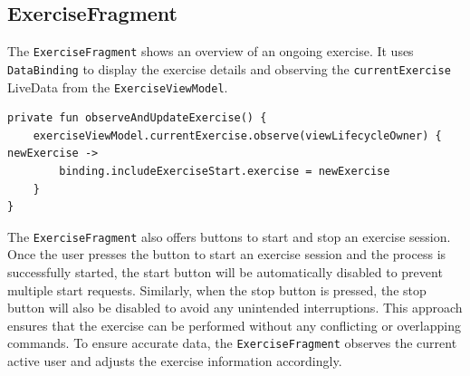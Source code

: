 \subsection{ExerciseFragment}
The \texttt{ExerciseFragment} shows an overview of an ongoing exercise. It uses \texttt{DataBinding} to display the exercise details and observing the \texttt{currentExercise} LiveData from the \texttt{ExerciseViewModel}. 
\begin{lstlisting}[caption={Observer for currentExercise (HomeFragment)}]
private fun observeAndUpdateExercise() {
    exerciseViewModel.currentExercise.observe(viewLifecycleOwner) { newExercise ->
        binding.includeExerciseStart.exercise = newExercise
    }
}
\end{lstlisting}

The \texttt{ExerciseFragment} also offers buttons to start and stop an exercise session.
Once the user presses the button to start an exercise session and the process is successfully started, the start button will be automatically disabled to prevent multiple start requests. Similarly, when the stop button is pressed, the stop button will also be disabled to avoid any unintended interruptions. 
This approach ensures that the exercise can be performed without any conflicting or overlapping commands.
To ensure accurate data, the \texttt{ExerciseFragment} observes the current active user and adjusts the exercise information accordingly.


